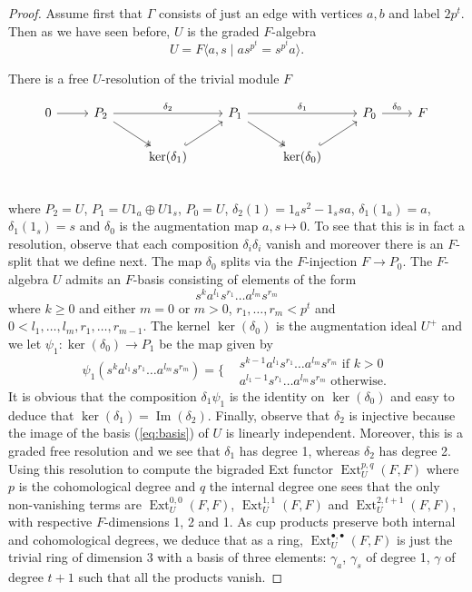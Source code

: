 \documentclass[10pt, oneside]{amsart}
\newcommand{\im}{\operatorname{Im}}
\newcommand{\Ext}{\operatorname{Ext}}
\theoremstyle{definition}
\theoremstyle{remark}
\theoremstyle{plain}
\begin{document}
\begin{proof} Assume first that $\Gamma$ consists of just an edge with vertices $a,b$ and label $2p^t$. Then as we have seen before,
 $U$ is the graded $F$-algebra
$$U=F\langle a,s\mid as^{p^t}=s^{p^t}a\rangle.$$

There is a free $U$-resolution of the trivial module $F$

\begin{equation*}\begin{tikzcd}
0\arrow[r]&[0.1em]P_2\arrow[rr, "\delta_2"]\arrow[dr, two heads] &  &P_1\arrow[rr, "\delta_1"]\arrow[dr, two heads] & & P_0\arrow[r, "\delta_0"] &F\\
& &\ker(\delta_1)\arrow[ur, hook]&& \ker(\delta_0)\arrow[ur, hook]&\\
\end{tikzcd}\end{equation*}
where $P_2=U$, $P_1=U1_a\oplus U1_s$, $P_0=U$, $\delta_2(1)=1_as^2-1_ssa$, $\delta_1(1_a)=a$, $\delta_1(1_s)=s$ and $\delta_0$ is the augmentation map $a,s\mapsto 0$. To see that this is in fact a resolution, observe that each composition $\delta_i\delta_i$ vanish and moreover there is an $F$-split that we define next. The map $\delta_0$ splits via the $F$-injection $F\to P_0$. 
The $F$-algebra $U$ admits an $F$-basis consisting of elements of the form
\begin{equation}\label{eq:basis}
    s^ka^{l_1}s^{r_1}\ldots a^{l_m}s^{r_m}
\end{equation}
where $k\geq 0$ and either $m=0$ or $m>0$, $r_1,\ldots,r_m<p^t$ and $0<l_1,\ldots,l_m,r_1,\ldots,r_{m-1}$. The kernel $\ker(\delta_0)$ is the augmentation ideal $U^+$ and we let
 $\psi_1:\ker(\delta_0)\to P_1$ be the map given by
$$\psi_1(s^ka^{l_1}s^{r_1}\ldots a^{l_m}s^{r_m})=\Bigg\{\begin{aligned}
&s^{k-1}a^{l_1}s^{r_1}\ldots a^{l_m}s^{r_m}\text{ if }k>0\\
&a^{l_1-1}s^{r_1}\ldots a^{l_m}s^{r_m}\text{ otherwise}.
\end{aligned}$$
It is obvious that the composition $\delta_1\psi_1$ is the identity on $\ker(\delta_0)$ and easy to deduce that $\ker(\delta_1)=\im(\delta_2)$. Finally, observe that $\delta_2$ is injective because the image of the basis (\ref{eq:basis}) of $U$ is linearly independent.
Moreover, this is a graded free resolution and we see that $\delta_1$ has degree 1, whereas $\delta_2$ has degree 2. Using this resolution to compute the bigraded Ext functor $\Ext^{p,q}_U(F,F)$ where $p$ is the cohomological degree and $q$ the internal degree one sees that the only non-vanishing terms are
$\Ext_U^{0,0}(F,F)$,
$\Ext_U^{1,1}(F,F)$ and
$\Ext_U^{2,t+1}(F,F)$, with respective $F$-dimensions 1, 2 and 1. As cup products preserve both internal and cohomological degrees, we deduce that as a ring, $\Ext^{\bullet,\bullet}_U(F,F)$ is just the trivial ring of dimension 3 with a basis of three elements: $\gamma_a$, $\gamma_s$ of degree 1, $\gamma$ of degree $t+1$ such that all the products vanish. 



\end{proof}
\end{document}

